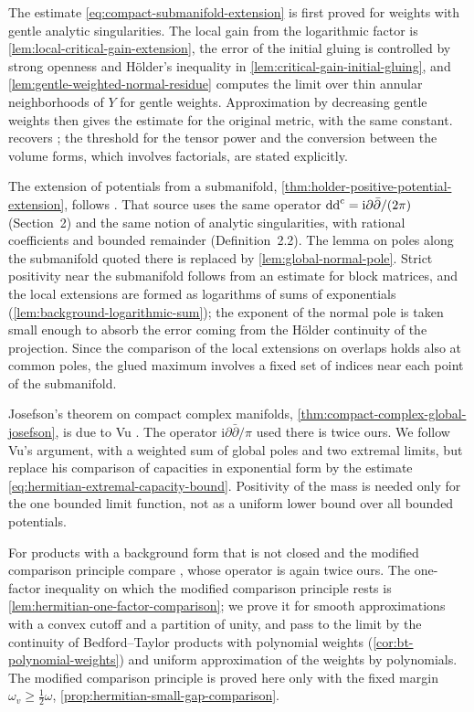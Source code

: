 The estimate \eqref{eq:compact-submanifold-extension} is first proved for weights with gentle analytic singularities. The local gain from the logarithmic factor is \cref{lem:local-critical-gain-extension}, the error of the initial gluing is controlled by strong openness and H\"older's inequality in \cref{lem:critical-gain-initial-gluing}, and \cref{lem:gentle-weighted-normal-residue} computes the limit over thin annular neighborhoods of $Y$ for gentle weights. Approximation by decreasing gentle weights then gives the estimate for the original metric, with the same constant.  recovers \cite[Theorem~1.8.1]{XiaSampleBook}; the threshold for the tensor power and the conversion between the volume forms, which involves factorials, are stated explicitly.

The extension of potentials from a submanifold, \cref{thm:holder-positive-potential-extension}, follows \cite[Theorem 6.1 and its proof, Lemma 6.2]{DRWNXZ}. That source uses the same operator $\mathrm{dd}^{\mathrm{c}}=\mathrm i\partial\bar\partial/(2\pi)$ (Section~2) and the same notion of analytic singularities, with rational coefficients and bounded remainder (Definition~2.2). The lemma on poles along the submanifold quoted there is replaced by \cref{lem:global-normal-pole}. Strict positivity near the submanifold follows from an estimate for block matrices, and the local extensions are formed as logarithms of sums of exponentials (\cref{lem:background-logarithmic-sum}); the exponent of the normal pole is taken small enough to absorb the error coming from the H\"older continuity of the projection. Since the comparison of the local extensions on overlaps holds also at common poles, the glued maximum involves a fixed set of indices near each point of the submanifold.

Josefson's theorem on compact complex manifolds, \cref{thm:compact-complex-global-josefson}, is due to Vu \cite[Theorem 1.1 and its proof]{Vu19}. The operator $\mathrm i\partial\bar\partial/\pi$ used there is twice ours. We follow Vu's argument, with a weighted sum of global poles and two extremal limits, but replace his comparison of capacities in exponential form by the estimate \eqref{eq:hermitian-extremal-capacity-bound}. Positivity of the mass is needed only for the one bounded limit function, not as a uniform lower bound over all bounded potentials.

For products with a background form that is not closed and the modified comparison principle compare \cite[Section 1, and Theorem 2.3 and its proof]{KN2015v2}, whose operator is again twice ours. The one-factor inequality on which the modified comparison principle rests is \cref{lem:hermitian-one-factor-comparison}; we prove it for smooth approximations with a convex cutoff and a partition of unity, and pass to the limit by the continuity of Bedford--Taylor products with polynomial weights (\cref{cor:bt-polynomial-weights}) and uniform approximation of the weights by polynomials. The modified comparison principle is proved here only with the fixed margin $\omega_v\geq\frac12\omega$, \cref{prop:hermitian-small-gap-comparison}.

